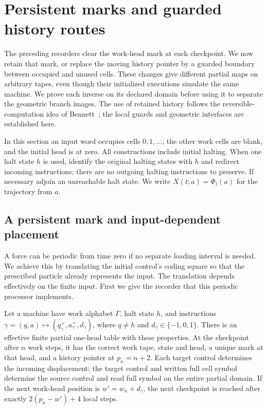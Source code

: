 \section{Persistent marks and guarded history routes}
\label{ba:marked-routes}

The preceding recorders clear the work-head mark at each checkpoint.
We now retain that mark, or replace the moving history pointer by a
guarded boundary between occupied and unused cells.  These changes give
different partial maps on arbitrary tapes, even though their initialized
executions simulate the same machine.  We prove each inverse on its
declared domain before using it to separate the geometric branch images.
The use of retained history follows the reversible-computation idea of
Bennett~\cite{Bennett1973}; the local guards and geometric interfaces
are established here.

In this section an input word occupies cells $0,1,\ldots$, the other
work cells are blank, and the initial head is at zero.  All constructions
include initial halting.  When one halt state $h$ is used, identify the
original halting states with $h$ and redirect incoming instructions;
there are no outgoing halting instructions to preserve.  If necessary
adjoin an unreachable halt state.
We write $X(t;a)=\Phi_t(a)$ for the trajectory from $a$.

\subsection{A persistent mark and input-dependent placement}
\label{ba:persistent-periodic}

A force can be periodic from time zero if no separate loading interval
is needed.  We achieve this by translating the initial control's coding
square so that the prescribed particle already represents the input.
The translation depends effectively on the finite input.  First we give
the recorder that this periodic processor implements.

\begin{lemma}
\label{ba:persistent-compiler}
Let a machine have work alphabet $\Gamma$, halt state $h$, and
instructions
$\gamma=(q,a)\mapsto(q^+_\gamma,a^+_\gamma,d_\gamma)$,
where $q\ne h$ and $d_\gamma\in\{-1,0,1\}$.
There is an effective finite partial one-head table with these properties.
At the checkpoint after $n$ work steps, it has the correct work tape,
state and head, a unique mark at that head, and a history pointer at
$p_n=n+2$.  Each target control determines the incoming displacement;
the target control and written full cell symbol determine the source
control and read full symbol on the entire partial domain.  If the next
work-head position is $w'=w_n+d_\gamma$, the next checkpoint is reached
after exactly $2(p_n-w')+4$ local steps.
\end{lemma}

